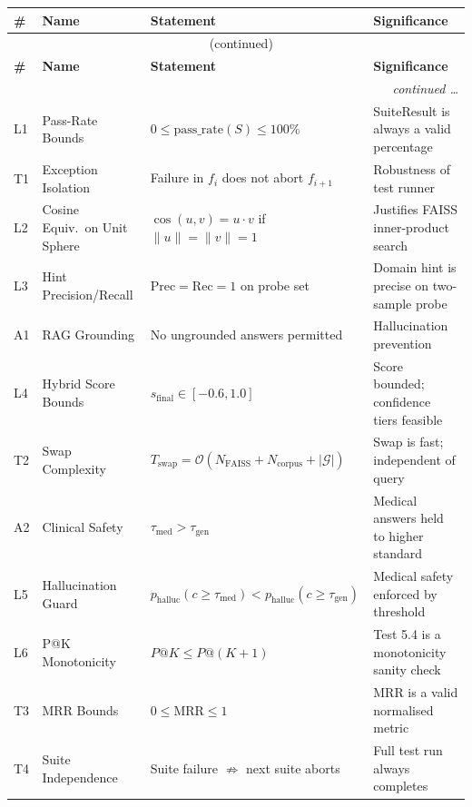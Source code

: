 \documentclass[12pt,a4paper]{article}
\begin{document}
\begin{longtable}{p{0.6cm} p{4.5cm} p{4cm} p{4.5cm}}
\toprule
\textbf{\#} & \textbf{Name} & \textbf{Statement} & \textbf{Significance}\\
\midrule
\endfirsthead
\multicolumn{4}{c}{\tablename\ \thetable{} (continued)}\\
\toprule
\textbf{\#} & \textbf{Name} & \textbf{Statement} & \textbf{Significance}\\
\midrule
\endhead
\midrule
\multicolumn{4}{r}{\textit{continued \ldots}}\\
\endfoot
\bottomrule
\endlastfoot

L1 & Pass-Rate Bounds
   & $0 \leq \text{pass\_rate}(S) \leq 100\%$
   & SuiteResult is always a valid percentage \\
T1 & Exception Isolation
   & Failure in $f_i$ does not abort $f_{i+1}$
   & Robustness of test runner \\
L2 & Cosine Equiv.\ on Unit Sphere
   & $\cos(u,v) = u\cdot v$ if $\|u\|=\|v\|=1$
   & Justifies FAISS inner-product search \\
L3 & Hint Precision/Recall
   & $\text{Prec}=\text{Rec}=1$ on probe set
   & Domain hint is precise on two-sample probe \\
A1 & RAG Grounding
   & No ungrounded answers permitted
   & Hallucination prevention \\
L4 & Hybrid Score Bounds
   & $s_{\text{final}} \in [-0.6, 1.0]$
   & Score bounded; confidence tiers feasible \\
T2 & Swap Complexity
   & $T_\text{swap} = \mathcal{O}(N_{\text{FAISS}} + N_{\text{corpus}} + |\mathcal{G}|)$
   & Swap is fast; independent of query \\
A2 & Clinical Safety
   & $\tau_{\text{med}} > \tau_{\text{gen}}$
   & Medical answers held to higher standard \\
L5 & Hallucination Guard
   & $p_{\text{halluc}}(c \geq \tau_\text{med}) < p_{\text{halluc}}(c \geq \tau_\text{gen})$
   & Medical safety enforced by threshold \\
L6 & P@K Monotonicity
   & $P@K \leq P@(K+1)$
   & Test 5.4 is a monotonicity sanity check \\
T3 & MRR Bounds
   & $0 \leq \text{MRR} \leq 1$
   & MRR is a valid normalised metric \\
T4 & Suite Independence
   & Suite failure $\not\Rightarrow$ next suite aborts
   & Full test run always completes \\
\end{longtable}
\end{document}
